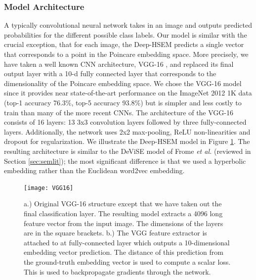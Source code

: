 \documentclass[12pt]{report}
\begin{document}
\subsubsection{Model Architecture}
A typically convolutional neural network takes in an image and outputs predicted probabilities for the different possible class labels. Our model is similar with the crucial exception, that for each image, the Deep-HSEM predicts a single vector that corresponds to a point in the Poincare embedding space. More precisely, we have taken a well known CNN architecture, VGG-16 \cite{Simonyan2014}, and replaced its final output layer with a 10-d fully connected layer that corresponds to the dimensionality of the Poincare embedding space. We chose the VGG-16 model since it provides near state-of-the-art performance on the ImageNet 2012 1K data (top-1 accuracy 76.3\%, top-5 accuracy 93.8\%) but is simpler and less costly to train than many of the more recent CNNs. The architecture of the VGG-16 consists of 16 layers: 13 3x3 convolution layers followed by three fully-connected layers. Additionally, the network uses 2x2 max-pooling, ReLU non-linearities and dropout for regularization. We illustrate the Deep-HSEM model in Figure \ref{fig:dhsem}. The resulting architecture is similar to the DeViSE model of Frome \textit{et al.} \cite{Frome2013} (reviewed in Section \ref{sec:semlit}); the most significant difference is that we used a hyperbolic embedding rather than the Euclidean word2vec embedding. 

\begin{figure}
  \centering
  \texttt{[image: VGG16]}
  \caption{a.) Original VGG-16 structure except that we have taken out the final classification layer. The resulting model extracts a 4096 long feature vector from the input image. The dimensions of the layers are in the square brackets. b.) The VGG feature extractor is attached to at fully-connected layer which outputs a 10-dimensional embedding vector prediction. The distance of this prediction from the ground-truth embedding vector is used to compute a scalar loss. This is used to backpropagate gradients through the network.}
  \label{fig:dhsem}
\end{figure}
\end{document}

